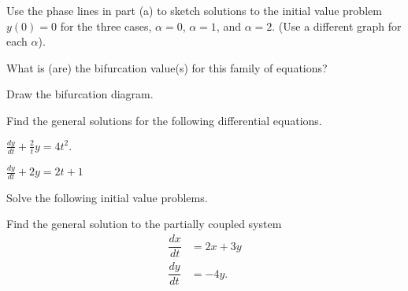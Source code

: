 \documentclass[11pt]{exam}
\newcommand{\ds}{\displaystyle}
\begin{document}
\begin{questions}
\begin{parts}
\item Use the phase lines in part (a) to sketch solutions to the initial value problem $y(0) =  0$ for the three cases, $\alpha = 0$, $\alpha=1$, and $\alpha =2$.  (Use a different graph for each $\alpha$).  
\vfill

\item What is (are) the bifurcation value(s) for this family of equations?  
\vfill
\item Draw the bifurcation diagram.  
\vfill 

\end{parts}
\question Find the general solutions for the following differential equations.  
\begin{parts}
\item $\ds{\frac{dy}{dt} + \frac{2}{t}y = 4t^2.}$
\vfill
\item $\ds{\frac{dy}{dt} + 2y = 2t+1}$
\vfill

\end{parts}

\newpage

\question Solve the following initial value problems. 

\question Find the general solution to the partially coupled system
\begin{align*}
\dfrac{dx}{dt} &= 2x + 3y \\[0.1in]
\dfrac{dy}{dt} &= -4y.
\end{align*}
\vfill



\end{questions}
\end{document}
